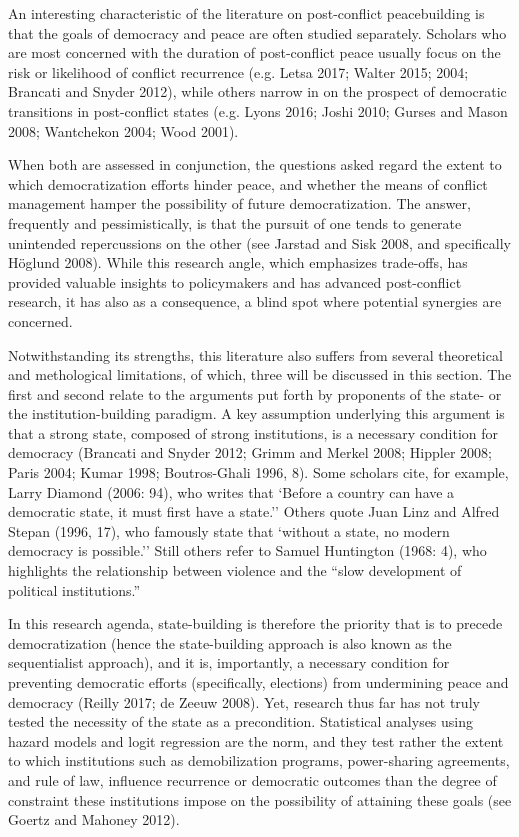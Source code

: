 \documentclass [11pt]{article}
\begin{document}
An interesting characteristic of the literature on post-conflict peacebuilding is that the goals of democracy and peace are often studied separately. Scholars who are most concerned with the duration of post-conflict peace usually focus on the risk or likelihood of conflict recurrence (e.g. Letsa 2017; Walter 2015; 2004; Brancati and Snyder 2012), while others narrow in on the prospect of democratic transitions in post-conflict states (e.g. Lyons 2016; Joshi 2010; Gurses and Mason 2008; Wantchekon 2004; Wood 2001).

When both are assessed in conjunction, the questions asked regard the extent to which democratization efforts hinder peace, and whether the means of conflict management hamper the possibility of future democratization. The answer, frequently and pessimistically, is that the pursuit of one tends to generate unintended repercussions on the other (see Jarstad and Sisk 2008, and specifically Höglund 2008). While this research angle, which emphasizes trade-offs, has provided valuable insights to policymakers and has advanced post-conflict research, it has also as a consequence, a blind spot where potential synergies are concerned.

Notwithstanding its strengths, this literature also suffers from several theoretical and methological limitations, of which, three will be discussed in this section. The first and second relate to the arguments put forth by proponents of the state- or the institution-building paradigm. A key assumption underlying this argument is that a strong state, composed of strong institutions, is a necessary condition for democracy (Brancati and Snyder 2012; Grimm and Merkel 2008; Hippler 2008; Paris 2004; Kumar 1998; Boutros-Ghali 1996, 8). Some scholars cite, for example, Larry Diamond (2006: 94), who writes that `Before a country can have a democratic state, it must first have a state.'' Others quote Juan Linz and Alfred Stepan (1996, 17), who famously state that `without a state, no modern democracy is possible.'' Still others refer to Samuel Huntington (1968: 4), who highlights the relationship between violence and the ``slow development of political institutions.''

In this research agenda, state-building is therefore the priority that is to precede democratization (hence the state-building approach is also known as the sequentialist approach), and it is, importantly, a necessary condition for preventing democratic efforts (specifically, elections) from undermining peace and democracy (Reilly 2017; de Zeeuw 2008). Yet, research thus far has not truly tested the necessity of the state as a precondition. Statistical analyses using hazard models and logit regression are the norm, and they test rather the extent to which institutions such as demobilization programs, power-sharing agreements, and rule of law, influence recurrence or democratic outcomes than the degree of constraint these institutions impose on the possibility of attaining these goals (see Goertz and Mahoney 2012).
\end{document}
